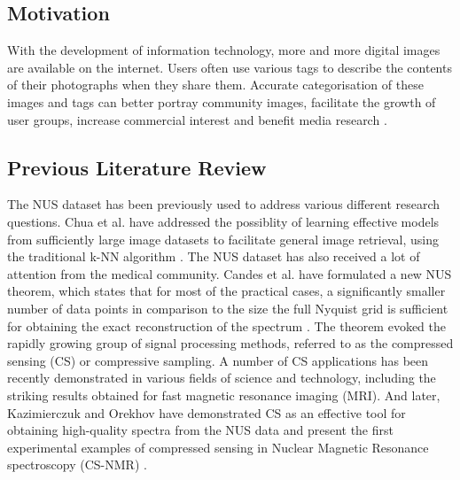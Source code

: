 \documentclass{article}
\begin{document}


\subsection{Motivation}
With the development of information technology, more and more digital images are available on the internet. Users often use various tags to describe the contents of their photographs when they share them. Accurate categorisation of these images and tags can better portray community images, facilitate the growth of user groups, increase commercial interest and benefit media research \cite{chua2009nus}.

\subsection{Previous Literature Review}
The NUS dataset has been previously used to address various different research questions. Chua et al. have addressed the possiblity of learning effective models from sufficiently large image datasets to facilitate general image retrieval, using the traditional k-NN algorithm \cite{10.1145/1646396.1646452}. The NUS dataset has also received a lot of attention from the medical community. Candes et al. have formulated a new NUS theorem, which states that for most of the practical cases, a significantly smaller number of data points in comparison to the size the full Nyquist grid is sufficient for obtaining the exact reconstruction of the spectrum \cite{1580791}. The theorem evoked the rapidly growing group of signal processing methods, referred to as the compressed sensing (CS) or compressive sampling. A number of CS applications has been recently demonstrated in various fields of science and technology, including the striking results obtained for fast magnetic resonance imaging (MRI). And later, Kazimierczuk and Orekhov have demonstrated CS as an effective tool for obtaining high-quality spectra from the NUS data and present the first experimental examples of compressed sensing in Nuclear Magnetic Resonance spectroscopy (CS-NMR) \cite{https://doi.org/10.1002/anie.201100370}.
\end{document}
